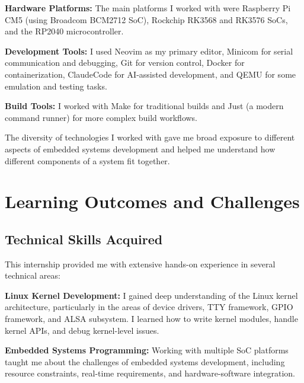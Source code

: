 \documentclass[12pt,a4paper]{report}
\begin{document}
\textbf{Hardware Platforms:} The main platforms I worked with were Raspberry Pi CM5 (using Broadcom BCM2712 SoC), Rockchip RK3568 and RK3576 SoCs, and the RP2040 microcontroller.

\vspace{0.3cm}

\textbf{Development Tools:} I used Neovim as my primary editor, Minicom for serial communication and debugging, Git for version control, Docker for containerization, ClaudeCode for AI-assisted development, and QEMU for some emulation and testing tasks.

\vspace{0.3cm}

\textbf{Build Tools:} I worked with Make for traditional builds and Just (a modern command runner) for more complex build workflows.

\vspace{0.3cm}

The diversity of technologies I worked with gave me broad exposure to different aspects of embedded systems development and helped me understand how different components of a system fit together.

\chapter{Learning Outcomes and Challenges}

\section{Technical Skills Acquired}

This internship provided me with extensive hands-on experience in several technical areas:

\vspace{0.3cm}

\textbf{Linux Kernel Development:} I gained deep understanding of the Linux kernel architecture, particularly in the areas of device drivers, TTY framework, GPIO framework, and ALSA subsystem. I learned how to write kernel modules, handle kernel APIs, and debug kernel-level issues.

\vspace{0.3cm}

\textbf{Embedded Systems Programming:} Working with multiple SoC platforms taught me about the challenges of embedded systems development, including resource constraints, real-time requirements, and hardware-software integration.
\end{document}
